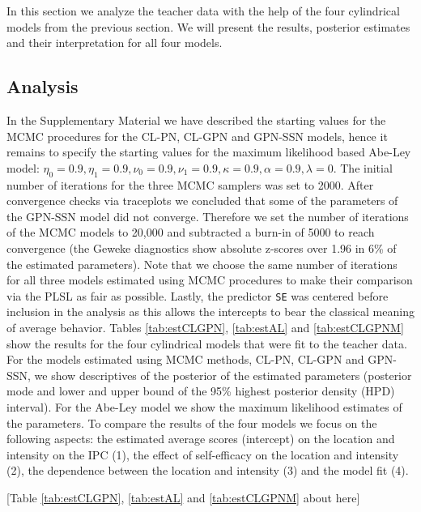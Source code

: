 \documentclass[man,mask]{apa6}
\begin{document}
In this section we analyze the teacher data with the help of the four
cylindrical models from the previous section. We will present the results,
posterior estimates and their interpretation for all four models.

\subsection{Analysis}\label{DataResults}

In the Supplementary Material we have described the starting values for the MCMC
procedures for the CL-PN, CL-GPN and GPN-SSN models, hence it remains to specify
the starting values for the maximum likelihood based Abe-Ley model: \(\eta_0 = 0.9, \eta_1 = 0.9, \nu_0 = 0.9, \nu_1 = 0.9, \kappa = 0.9, \alpha = 0.9, \lambda = 0\). The initial number of iterations for the three MCMC samplers was set to
2000. After convergence checks via traceplots we concluded that some of the
parameters of the GPN-SSN model did not converge. Therefore we set the number of
iterations of the MCMC models to 20,000 and subtracted a burn-in of 5000 to
reach convergence (the Geweke diagnostics show absolute z-scores over 1.96 in
6\% of the estimated parameters). Note that we choose the same number of
iterations for all three models estimated using MCMC procedures to make
their comparison via the PLSL as fair as possible. Lastly, the predictor
\verb|SE| was centered before inclusion in the analysis as this allows the
intercepts to bear the classical meaning of average behavior.\newline
\indent Tables \ref{tab:estCLGPN}, \ref{tab:estAL} and \ref{tab:estCLGPNM} show
the results for the four cylindrical models that were fit to the teacher data.
For the models estimated using MCMC methods, CL-PN, CL-GPN and GPN-SSN, we show
descriptives of the posterior of the estimated parameters (posterior mode and
lower and upper bound of the 95\% highest posterior density (HPD) interval). For
the Abe-Ley model we show the maximum likelihood estimates of the parameters. To
compare the results of the four models we focus on the following aspects: the
estimated average scores (intercept) on the location and intensity on the IPC (1), the effect of self-efficacy on the location and intensity (2), the dependence between the location and intensity (3) and the model fit (4).

\hfil \hspace{2cm} {[}Table \ref{tab:estCLGPN}, \ref{tab:estAL} and \ref{tab:estCLGPNM} about here{]} \hfil
\end{document}
